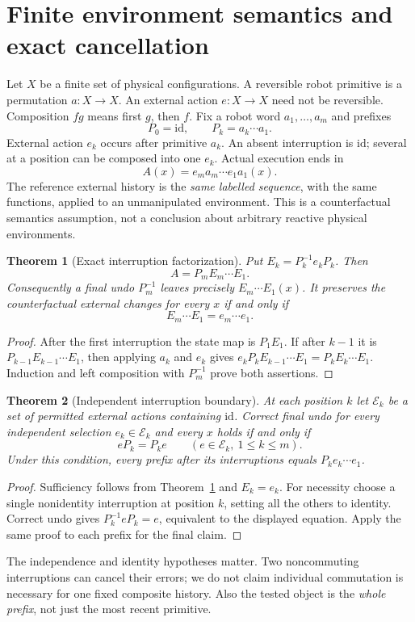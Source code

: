 \documentclass[11pt]{article}
\newtheorem{theorem}{Theorem}\newtheorem{proposition}{Proposition}\newtheorem{definition}{Definition}
\newcommand{\id}{\mathrm{id}}
\begin{document}
\section{Finite environment semantics and exact cancellation}
Let $X$ be a finite set of physical configurations. A reversible robot primitive is a permutation $a:X\to X$. An external action $e:X\to X$ need not be reversible. Composition $fg$ means first $g$, then $f$. Fix a robot word $a_1,\ldots,a_m$ and prefixes
\[
 P_0=\id,\qquad P_k=a_k\cdots a_1.
\]
External action $e_k$ occurs after primitive $a_k$. An absent interruption is $\id$; several at a position can be composed into one $e_k$. Actual execution ends in
\[
 A(x)=e_m a_m\cdots e_1a_1(x).
\]
The reference external history is the \emph{same labelled sequence}, with the same functions, applied to an unmanipulated environment. This is a counterfactual semantics assumption, not a conclusion about arbitrary reactive physical environments.

\begin{theorem}[Exact interruption factorization]\label{thm:factor}
Put $E_k=P_k^{-1}e_kP_k$. Then
\[
 A=P_m E_m\cdots E_1.
\]
Consequently a final undo $P_m^{-1}$ leaves precisely $E_m\cdots E_1(x)$. It preserves the counterfactual external changes for every $x$ if and only if
\[
 E_m\cdots E_1=e_m\cdots e_1.
\]
\end{theorem}
\begin{proof}
After the first interruption the state map is $P_1E_1$. If after $k-1$ it is $P_{k-1}E_{k-1}\cdots E_1$, then applying $a_k$ and $e_k$ gives
$e_kP_kE_{k-1}\cdots E_1=P_kE_k\cdots E_1$.
Induction and left composition with $P_m^{-1}$ prove both assertions.
\end{proof}

\begin{theorem}[Independent interruption boundary]\label{thm:local}
At each position $k$ let $\mathcal E_k$ be a set of permitted external actions containing $\id$. Correct final undo for every independent selection $e_k\in\mathcal E_k$ and every $x$ holds if and only if
\[
 eP_k=P_ke\qquad(e\in\mathcal E_k,\ 1\leq k\leq m).
\]
Under this condition, every prefix after its interruptions equals
$P_k e_k\cdots e_1$.
\end{theorem}
\begin{proof}
Sufficiency follows from Theorem~\ref{thm:factor} and $E_k=e_k$. For necessity choose a single nonidentity interruption at position $k$, setting all the others to identity. Correct undo gives $P_k^{-1}eP_k=e$, equivalent to the displayed equation. Apply the same proof to each prefix for the final claim.
\end{proof}
The independence and identity hypotheses matter. Two noncommuting interruptions can cancel their errors; we do not claim individual commutation is necessary for one fixed composite history. Also the tested object is the \emph{whole prefix}, not just the most recent primitive.
\end{document}
